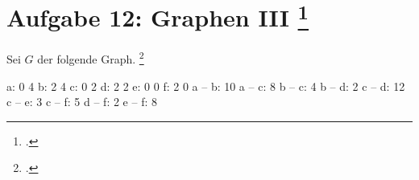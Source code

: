 \documentclass{bschlangaul-aufgabe}
\begin{document}

\section{Aufgabe 12: Graphen III
\footcite[(entnommen aus Algorithmen und Datenstrukturen, Übungsblatt 7, Universität Würzburg), Aufgabe 12]{aud:pu:7}}

Sei $G$ der folgende Graph.
\footcite[Thema 2 Aufgabe 4 (gekürzt)]{examen:46115:2018:03}

\begin{liGraphenFormat}
a: 0 4
b: 2 4
c: 0 2
d: 2 2
e: 0 0
f: 2 0
a -- b: 10
a -- c: 8
b -- c: 4
b -- d: 2
c -- d: 12
c -- e: 3
c -- f: 5
d -- f: 2
e -- f: 8
\end{liGraphenFormat}

\end{document}
